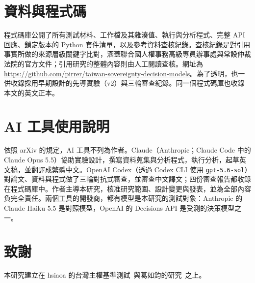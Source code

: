 \documentclass[11pt]{article}
\begin{document}
\section*{資料與程式碼}
程式碼庫公開了所有測試材料、工作檔及其雜湊值、執行與分析程式、完整 API 回應、鎖定版本的 Python 套件清單，以及參考資料查核紀錄。查核紀錄是對引用事實所做的來源層級關鍵字比對，涵蓋聯合國人權事務高級專員辦事處與常設仲裁法院的官方文件；引用研究的整體內容則由人工閱讀查核。網址為 \url{https://github.com/pirrer/taiwan-sovereignty-decision-models}。為了透明，也一併收錄採用早期設計的先導實驗（v2）與三輪審查紀錄。同一個程式碼庫也收錄本文的英文正本。

\section*{AI 工具使用說明}
依照 arXiv 的規定，AI 工具不列為作者。Claude（Anthropic；Claude Code 中的 Claude Opus 5.5）協助實驗設計，撰寫資料蒐集與分析程式，執行分析，起草英文稿，並翻譯成繁體中文。OpenAI Codex（透過 Codex CLI 使用 \texttt{gpt-5.6-sol}）對論文、資料與程式做了三輪對抗式審查，並審查中文譯文；四份審查報告都收錄在程式碼庫中。作者主導本研究，核准研究範圍、設計變更與發表，並為全部內容負完全責任。兩個工具的開發商，都有模型是本研究的測試對象：Anthropic 的 Claude Haiku 5.5 是對照模型，OpenAI 的 Decisions API 是受測的決策模型之一。

\section*{致謝}
本研究建立在 hsiaoa 的台灣主權基準測試~\cite{hsiaoa}與葛如鈞的研究~\cite{ko2026}之上。
\end{document}
